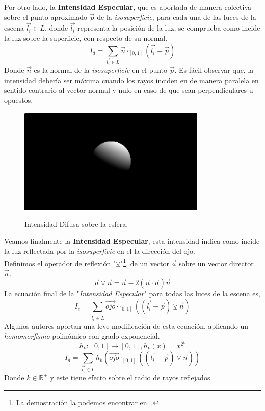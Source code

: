 Por otro lado, la \textbf{Intensidad Especular}, que es aportada de manera colectiva sobre el punto aproximado \(\Vec{p}\) de la \textit{isosuperficie}, para cada una de las luces de la escena \(\Vec{l_i}\in L\), donde \(\Vec{l_i}\) representa la posición de la luz, se comprueba como incide la luz sobre la superficie, con respecto de su normal. 
\[I_d = \sum_{\Vec{l_i}\in L} \Vec{n}\cdot_{[0, 1]}(\Vec{l_i}-\Vec{p})\]
Donde \(\Vec{n}\) es la normal de la \textit{isosuperficie} en el punto \(\Vec{p}\). Es fácil observar que, la intensidad debería ser máxima cuando los rayos inciden en de manera paralela en sentido contrario al vector normal y nulo en caso de que sean perpendiculares u opuestos.
\begin{figure}[H]
  \centering
  \captionsetup{justification=centering}%
  \includegraphics[width=0.8\textwidth]{secciones/imagenes/difusa.jpeg}\label{fig:difusse}
  \caption{Intensidad Difusa sobre la esfera.}
\end{figure}
Veamos finalmente la \textbf{Intensidad Especular}, esta intensidad indica como incide la luz reflectada  por la \textit{isosuperficie} en el la dirección del ojo.\\
Definimos el operador de reflexión "\(\veebar\)"\footnote{La demostración la podemos encontrar en...}, de un vector \(\Vec{a}\) sobre un vector director \(\Vec{n}\).
\[\Vec{a}\veebar\Vec{n}=\Vec{a} - 2(\Vec{n} \cdot \Vec{a})\Vec{n}\]
La ecuación final de la "\textit{Intensidad Especular}" para todas las luces de la escena es,
\[I_e = \sum_{\Vec{l_i}\in L} \Vec{ojo}\cdot_{[0, 1]}\left(\left(\Vec{l_i}-\Vec{p}\right) \veebar \Vec{n}\right)\]
Algunos autores aportan una leve modificación de esta ecuación, aplicando un \textit{homomorfismo} polinómico con grado exponencial.
\[h_k:[0,1]\longrightarrow[0,1] , h_k(x)=x^{2^k}\]
\[I_d = \sum_{\Vec{l_i}\in L} h_k\left(\Vec{ojo}\cdot_{[0, 1]}\left(\left(\Vec{l_i}-\Vec{p}\right) \veebar \Vec{n}\right)\right)\]
Donde \(k\in\mathbb{R}^{+}\) y este tiene efecto sobre el radio de rayos reflejados.
